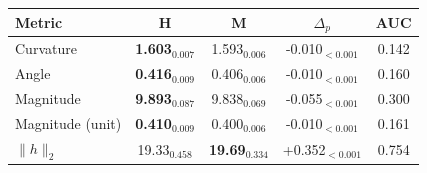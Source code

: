 \begin{tabular}{lcccc}
\toprule
\textbf{Metric} & \textbf{H} & \textbf{M} & \textbf{$\Delta_p$} & \textbf{AUC} \\
\midrule
Curvature & \textbf{1.603}$_{0.007}$ & 1.593$_{0.006}$ & -0.010$_{<0.001}$ & 0.142 \\
Angle & \textbf{0.416}$_{0.009}$ & 0.406$_{0.006}$ & -0.010$_{<0.001}$ & 0.160 \\
Magnitude & \textbf{9.893}$_{0.087}$ & 9.838$_{0.069}$ & -0.055$_{<0.001}$ & 0.300 \\
Magnitude (unit) & \textbf{0.410}$_{0.009}$ & 0.400$_{0.006}$ & -0.010$_{<0.001}$ & 0.161 \\
$\|h\|_2$ & 19.33$_{0.458}$ & \textbf{19.69}$_{0.334}$ & +0.352$_{<0.001}$ & 0.754 \\
\bottomrule
\end{tabular}

